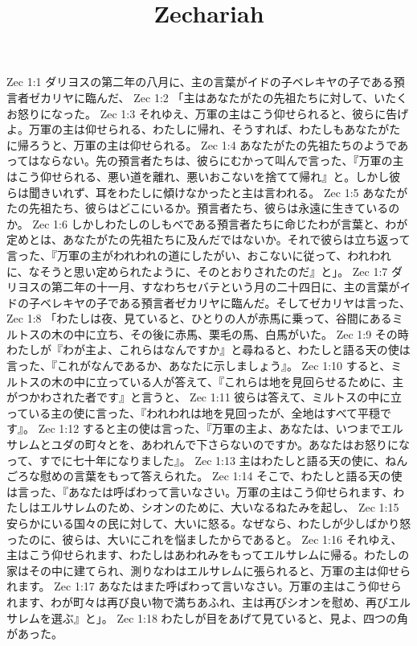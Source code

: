 

\title{Zechariah}

Zec 1:1  ダリヨスの第二年の八月に、主の言葉がイドの子ベレキヤの子である預言者ゼカリヤに臨んだ、
Zec 1:2  「主はあなたがたの先祖たちに対して、いたくお怒りになった。
Zec 1:3  それゆえ、万軍の主はこう仰せられると、彼らに告げよ。万軍の主は仰せられる、わたしに帰れ、そうすれば、わたしもあなたがたに帰ろうと、万軍の主は仰せられる。
Zec 1:4  あなたがたの先祖たちのようであってはならない。先の預言者たちは、彼らにむかって叫んで言った、『万軍の主はこう仰せられる、悪い道を離れ、悪いおこないを捨てて帰れ』と。しかし彼らは聞きいれず、耳をわたしに傾けなかったと主は言われる。
Zec 1:5  あなたがたの先祖たち、彼らはどこにいるか。預言者たち、彼らは永遠に生きているのか。
Zec 1:6  しかしわたしのしもべである預言者たちに命じたわが言葉と、わが定めとは、あなたがたの先祖たちに及んだではないか。それで彼らは立ち返って言った、『万軍の主がわれわれの道にしたがい、おこないに従って、われわれに、なそうと思い定められたように、そのとおりされたのだ』と」。
Zec 1:7  ダリヨスの第二年の十一月、すなわちセバテという月の二十四日に、主の言葉がイドの子ベレキヤの子である預言者ゼカリヤに臨んだ。そしてゼカリヤは言った、
Zec 1:8  「わたしは夜、見ていると、ひとりの人が赤馬に乗って、谷間にあるミルトスの木の中に立ち、その後に赤馬、栗毛の馬、白馬がいた。
Zec 1:9  その時わたしが『わが主よ、これらはなんですか』と尋ねると、わたしと語る天の使は言った、『これがなんであるか、あなたに示しましょう』。
Zec 1:10  すると、ミルトスの木の中に立っている人が答えて、『これらは地を見回らせるために、主がつかわされた者です』と言うと、
Zec 1:11  彼らは答えて、ミルトスの中に立っている主の使に言った、『われわれは地を見回ったが、全地はすべて平穏です』。
Zec 1:12  すると主の使は言った、『万軍の主よ、あなたは、いつまでエルサレムとユダの町々とを、あわれんで下さらないのですか。あなたはお怒りになって、すでに七十年になりました』。
Zec 1:13  主はわたしと語る天の使に、ねんごろな慰めの言葉をもって答えられた。
Zec 1:14  そこで、わたしと語る天の使は言った、『あなたは呼ばわって言いなさい。万軍の主はこう仰せられます、わたしはエルサレムのため、シオンのために、大いなるねたみを起し、
Zec 1:15  安らかにいる国々の民に対して、大いに怒る。なぜなら、わたしが少しばかり怒ったのに、彼らは、大いにこれを悩ましたからであると。
Zec 1:16  それゆえ、主はこう仰せられます、わたしはあわれみをもってエルサレムに帰る。わたしの家はその中に建てられ、測りなわはエルサレムに張られると、万軍の主は仰せられます。
Zec 1:17  あなたはまた呼ばわって言いなさい。万軍の主はこう仰せられます、わが町々は再び良い物で満ちあふれ、主は再びシオンを慰め、再びエルサレムを選ぶ』と」。
Zec 1:18  わたしが目をあげて見ていると、見よ、四つの角があった。
